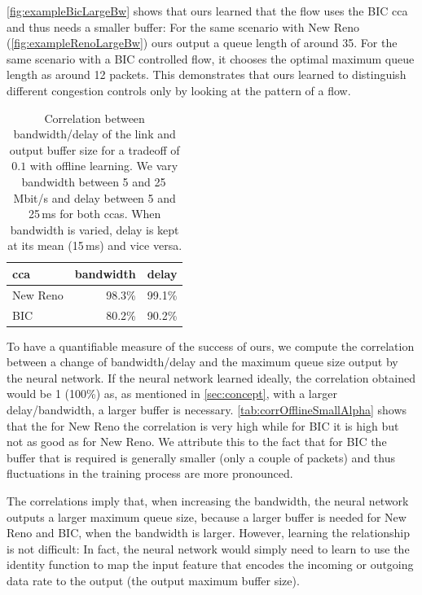 \documentclass[conference]{IEEEtran}
\begin{document}
\autoref{fig:exampleBicLargeBw} shows that \gls{ours} learned that the flow uses the BIC \gls{cca} and thus needs a smaller buffer: For the same scenario with New Reno (\autoref{fig:exampleRenoLargeBw}) \gls{ours} output a queue length of around 35. For the same scenario with a BIC controlled flow, it chooses the optimal maximum queue length as around 12 packets. This demonstrates that \gls{ours} learned to distinguish different congestion controls only by looking at the pattern of a flow. 

\begin{table}[h]
\caption{Correlation between bandwidth/delay of the link and output buffer size for a tradeoff of $0.1$ with offline learning. We vary bandwidth between 5 and 25\,Mbit/s and delay between 5 and 25\,ms for both \glspl{cca}. When bandwidth is varied, delay is kept at its mean (15\,ms) and vice versa.} \label{tab:corrOfflineSmallAlpha}
\centering
\begin{tabular}{lrr} \toprule
\gls{cca} & bandwidth & delay \\ \midrule
New Reno & 98.3\% & 99.1\% \\
BIC & 80.2\% & 90.2\% \\
\bottomrule
\end{tabular}
\end{table}

To have a quantifiable measure of the success of \gls{ours}, we compute the correlation between a change of bandwidth/delay and the maximum queue size output by the neural network. If the neural network learned ideally, the correlation obtained would be 1 (100\%) as, as mentioned in \autoref{sec:concept}, with a larger delay/bandwidth, a larger buffer is necessary. \autoref{tab:corrOfflineSmallAlpha} shows that the for New Reno the correlation is very high while for BIC it is high but not as good as for New Reno. We attribute this to the fact that for BIC the buffer that is required is generally smaller (only a couple of packets) and thus fluctuations in the training process are more pronounced. 

The correlations imply that, when increasing the bandwidth, the neural network outputs a larger maximum queue size, because a larger buffer is needed for New Reno and BIC, when the bandwidth is larger. However, learning the relationship is not difficult: In fact, the neural network would simply need to learn to use the identity function to map the input feature that encodes the incoming or outgoing data rate to the output (the output maximum buffer size). 
\end{document}
